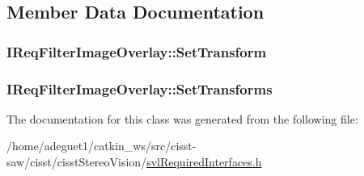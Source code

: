 \subsection{Member Data Documentation}
\hypertarget{class_i_req_filter_image_overlay_aea8a378df3af93768b3ffd3c6eb9ad2e}{
\subsubsection[{Set\-Transform}]{ I\-Req\-Filter\-Image\-Overlay\-::\-Set\-Transform}}\label{class_i_req_filter_image_overlay_aea8a378df3af93768b3ffd3c6eb9ad2e}
\hypertarget{class_i_req_filter_image_overlay_a23171709938c0c03dfe317aca65bb75b}{
\subsubsection[{Set\-Transforms}]{ I\-Req\-Filter\-Image\-Overlay\-::\-Set\-Transforms}}\label{class_i_req_filter_image_overlay_a23171709938c0c03dfe317aca65bb75b}


The documentation for this class was generated from the following file\-:\begin{DoxyCompactItemize}
\item 
/home/adeguet1/catkin\-\_\-ws/src/cisst-\/saw/cisst/cisst\-Stereo\-Vision/\hyperlink{svl_required_interfaces_8h}{svl\-Required\-Interfaces.\-h}\end{DoxyCompactItemize}

